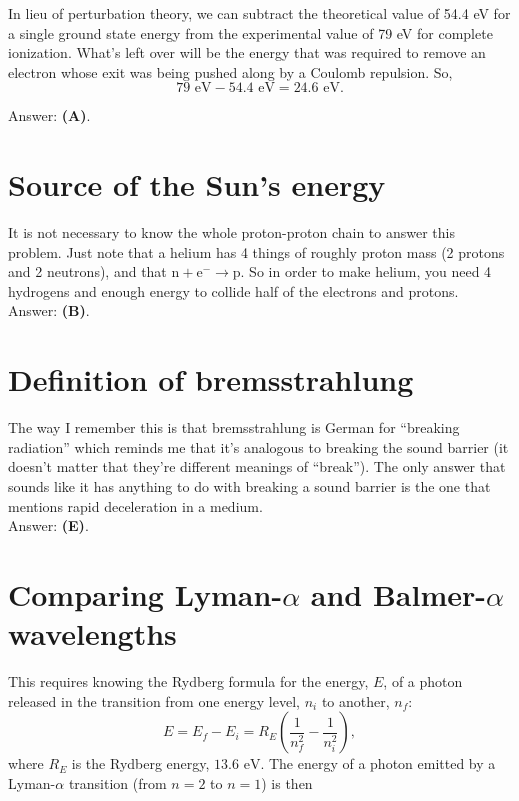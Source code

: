 \documentclass[11pt]{paper}
\newcommand{\answer}[1]{Answer: \textbf{(#1)}.}
\begin{document}
In lieu of perturbation theory, we can subtract the theoretical value of 54.4 eV for a single ground state energy from the experimental value of 79 eV for complete ionization.  What's left over will be the energy that was required to remove an electron whose exit was being pushed along by a Coulomb repulsion.  So, 
\begin{equation}
79 \text{ eV} - 54.4 \text{ eV} = 24.6 \text{ eV}.
\end{equation}

\answer{A}

\section{Source of the Sun's energy}
It is not necessary to know the whole proton-proton chain to answer this problem.  Just note that a helium has 4 things of roughly proton mass (2 protons and 2 neutrons), and that $\text{n} + \text{e}^- \rightarrow \text{p}$.  So in order to make helium, you need 4 hydrogens and enough energy to collide half of the electrons and protons.\\

\answer{B}

\section{Definition of bremsstrahlung}
The way I remember this is that bremsstrahlung is German for ``breaking radiation'' which reminds me that it's analogous to breaking the sound barrier (it doesn't matter that they're different meanings of ``break'').  The only answer that sounds like it has anything to do with breaking a sound barrier is the one that mentions rapid deceleration in a medium.\\

\answer{E}

\section{Comparing Lyman-$\alpha$ and Balmer-$\alpha$ wavelengths}
This requires knowing the Rydberg formula for the energy, $E$, of a photon released in the transition from one energy level, $n_i$ to another, $n_f$:
\begin{equation}
E = E_f - E_i = R_E \left(\frac{1}{n_f^2} - \frac{1}{n_i^2}\right),
\end{equation}
where $R_E$ is the Rydberg energy, $13.6 \text{ eV}$.  The energy of a photon emitted by a Lyman-$\alpha$ transition (from $n=2$ to $n=1$) is then
\end{document}
